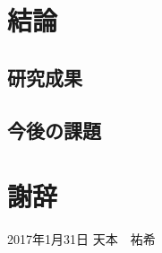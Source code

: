 \documentclass[12pt]{optlab-bachelor}
\def\氏名{天本　祐希}
\begin{document}
\chapter{結論}
\section{研究成果}
\section{今後の課題}




\chapter*{謝辞}

\begin{flushright}
  2017年1月31日 \氏名
\end{flushright}
\endmatter 
\end{document}
